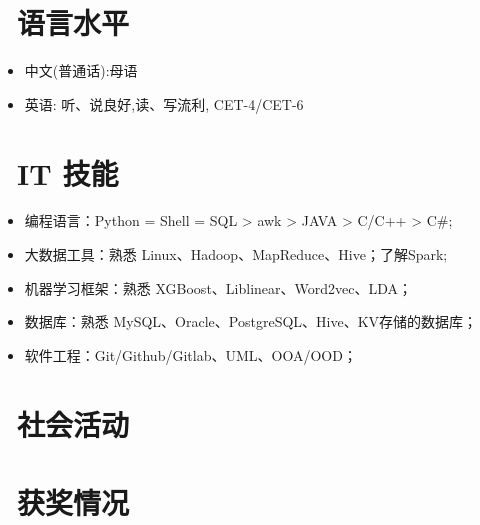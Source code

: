 \documentclass{resume}
\begin{document}
\section{\faLanguage\ 语言水平}
\begin{itemize}[parsep=0.5ex]
  \item 中文(普通话):母语
  \item 英语: 听、说良好,读、写流利, CET-4/CET-6
\end{itemize}
\medskip


\section{\faCogs\ IT 技能}
\begin{itemize}[parsep=0.5ex]
  \item 编程语言：Python = Shell = SQL > awk > JAVA > C/C++ > C\#;
  \item 大数据工具：熟悉 Linux、Hadoop、MapReduce、Hive；了解Spark;
  \item 机器学习框架：熟悉 XGBoost、Liblinear、Word2vec、LDA；
  \item 数据库：熟悉 MySQL、Oracle、PostgreSQL、Hive、KV存储的数据库；
  \item 软件工程：Git/Github/Gitlab、UML、OOA/OOD；
\end{itemize}
\medskip





\section{\faExpand\ 社会活动}
\medskip


\section{\faStar\ 获奖情况}
\medskip
\end{document}
